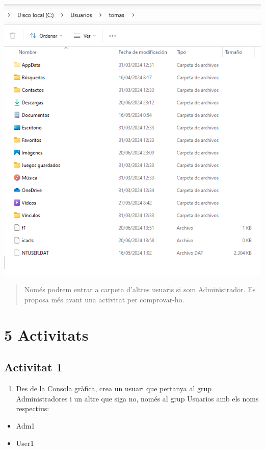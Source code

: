 \documentclass[
  a4paper,
]{article}
\providecommand{\tightlist}{%
  \setlength{\itemsep}{0pt}\setlength{\parskip}{0pt}}
\begin{document}
\includegraphics{png/CarpetesPerfil.png}

\begin{quote}
Només podrem entrar a carpeta d'altres usuaris si som Administrador. Es
proposa més avant una activitat per comprovar-ho.
\end{quote}

\section{5 Activitats}\label{activitats}

\subsection{Activitat 1}\label{activitat-1}

\begin{enumerate}
\def\labelenumi{\arabic{enumi}.}
\tightlist
\item
  Des de la Consola gràfica, crea un usuari que pertanya al grup
  Administradores i un altre que siga no, només al grup Usuarios amb els
  noms respectius:
\end{enumerate}

\begin{itemize}
\tightlist
\item
  Adm1
\item
  User1
\end{itemize}
\end{document}
